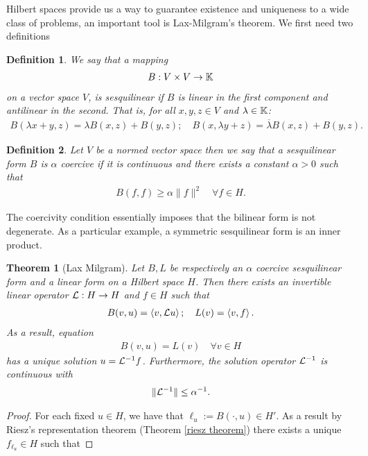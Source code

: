 \documentclass[12pt]{article}
\newtheorem{theorem}{Theorem}
\newtheorem{definition}{Definition}
\newcommand{\br}[1]{\left\langle#1\right\rangle} \newcommand{\set}[1]{\left\{#1\right\}}\newcommand{\qt}[1]{\left(#1\right)} \newcommand{\qp}[1]{\left(#1\right)}\newcommand{\qb}[1]{\left[#1\right]}
\renewcommand{\norm}[1]{\lVert #1 \rVert}\renewcommand{\abs}[1]{\left| #1 \right|}
\begin{document}
\begin{CJK*}{UTF8}{gbsn}
	Hilbert spaces provide us a way to guarantee existence and uniqueness to a wide class of problems, an important tool is Lax-Milgram's theorem. We first need two definitions
	\begin{definition}
		We say that a mapping
		\begin{align*}
			B:V \times V \to \mathbb{K}
		\end{align*}
		on a vector space $V$, is sesquilinear if $B$ is linear in the first component and antilinear in the second. That is, for all $x,y,z \in V$ and $\lambda \in \mathbb{K}$:
		\begin{align*}
			{B(\lambda x+y,z)}= \lambda B({x,z})+ B({y,z}); \quad B(x,\lambda y+z)= \overline{\lambda} B({x,z})+ B({y,z}) .
		\end{align*}
	\end{definition}
	\begin{definition}
		Let $V$ be a normed vector space then we say that a sesquilinear form  $B$ is $\alpha$ coercive if it is continuous and there exists a constant $\alpha>0$ such that
		\begin{align*}
			B(f,f)\geq \alpha\norm{f}^2 \quad\forall f \in  H.
		\end{align*}
	\end{definition}
	The coercivity condition essentially imposes that the bilinear form is not degenerate. As a particular example, a symmetric sesquilinear form is an inner product.
	\begin{theorem}[Lax Milgram]\label{Lax theorem}
		Let $B, L $ be respectively an $\alpha$ coercive sesquilinear form and a linear form on a Hilbert space $H$. Then there exists an invertible linear operator $\mathcal{L}:H \to H$ and $f \in H$ such that
		\begin{align*}
			B(v,u)=\br{v,\Ll u}; \quad L(v)=\br{v,f}.
		\end{align*}
		As a result, equation
		\begin{align}\label{lax eq}
			B(v,u)=L(v) \quad\forall v \in H
		\end{align}
		has a unique solution $u= \mathcal{L}^{-1} f $. Furthermore, the solution operator $\mathcal{L}^{-1}$ is continuous with \begin{align*}
			\norm{\Ll^{-1}}\leq \alpha^{-1} .
		\end{align*}
	\end{theorem}
	\begin{proof}
		For each fixed $u \in H$, we have that $\ell_u :=B(\cdot ,u) \in  H'$. As a result by Riesz's representation theorem (Theorem \ref{riesz theorem}) there exists a unique $ f_{\ell _u} \in H$ such that

\end{proof}
\end{CJK*}
\end{document}
